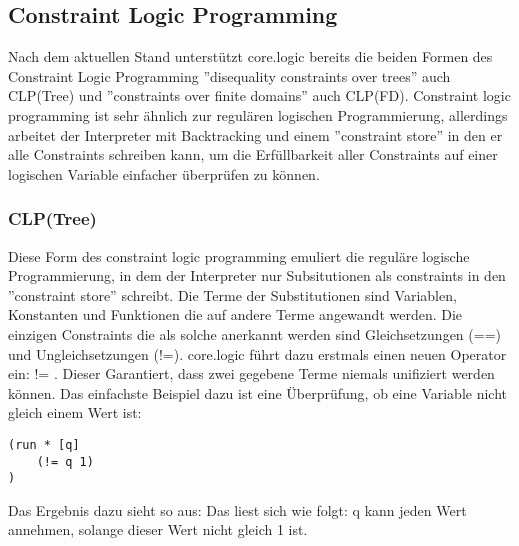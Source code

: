 \subsection{Constraint Logic Programming}
Nach dem aktuellen Stand unterstützt core.logic bereits die beiden Formen des Constraint Logic Programming ''disequality constraints over trees'' auch CLP(Tree) und ''constraints over finite domains'' auch CLP(FD).
Constraint logic programming ist sehr ähnlich zur regulären logischen Programmierung, allerdings arbeitet der Interpreter mit Backtracking und einem ''constraint store'' in den er alle Constraints schreiben kann, um die Erfüllbarkeit aller Constraints auf einer logischen Variable einfacher überprüfen zu können.

\subsubsection{CLP(Tree)}
Diese Form des constraint logic programming emuliert die reguläre logische Programmierung, in dem der Interpreter nur Subsitutionen als constraints in den ''constraint store'' schreibt. 
Die Terme der Substitutionen sind Variablen, Konstanten und Funktionen die auf andere Terme angewandt werden. 
Die einzigen Constraints die als solche anerkannt werden sind Gleichsetzungen (==) und Ungleichsetzungen (!=).
core.logic führt dazu erstmals einen neuen Operator ein: != . Dieser Garantiert, dass zwei gegebene Terme niemals unifiziert werden können.
Das einfachste Beispiel dazu ist eine Überprüfung, ob eine Variable nicht gleich einem Wert ist:
\begin{lstlisting}
(run * [q]
	(!= q 1)
)
\end{lstlisting}
Das Ergebnis dazu sieht so aus:  Das liest sich wie folgt: q kann jeden Wert annehmen, solange dieser Wert nicht gleich 1 ist.

